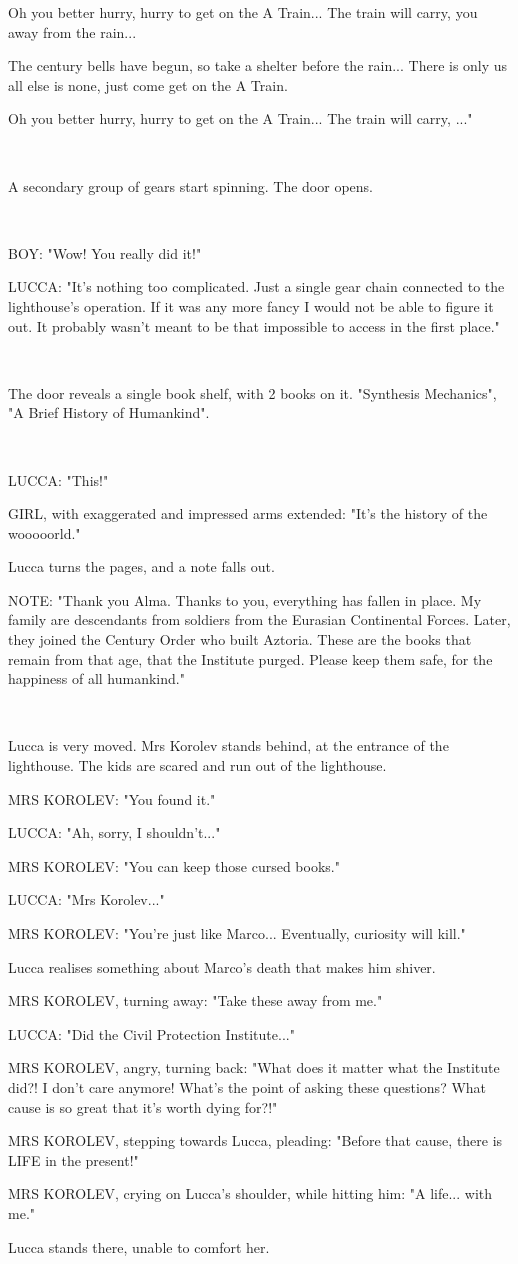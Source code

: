 \documentclass[11pt]{article}
\begin{document}
Oh you better hurry, hurry to get on the A Train...
The train will carry, you away from the rain...

The century bells have begun, so take a shelter before the rain...
There is only us all else is none, just come get on the A Train.

Oh you better hurry, hurry to get on the A Train...
The train will carry, ..."

\ 

A secondary group of gears start spinning.
The door opens.

\ 

BOY: "Wow! You really did it!"

LUCCA: "It's nothing too complicated. Just a single gear chain connected to the lighthouse's operation. 
If it was any more fancy I would not be able to figure it out.
It probably wasn't meant to be that impossible to access in the first place."

\ 

The door reveals a single book shelf, with 2 books on it. 
"Synthesis Mechanics", "A Brief History of Humankind".

\ 

LUCCA: "This!"

GIRL, with exaggerated and impressed arms extended: "It's the history of the wooooorld."

Lucca turns the pages, and a note falls out.

NOTE: "Thank you Alma. Thanks to you, everything has fallen in place.
My family are descendants from soldiers from the Eurasian Continental Forces. 
Later, they joined the Century Order who built Aztoria.
These are the books that remain from that age, that the Institute purged.
Please keep them safe, for the happiness of all humankind."

\ 

Lucca is very moved.
Mrs Korolev stands behind, at the entrance of the lighthouse.
The kids are scared and run out of the lighthouse.

MRS KOROLEV: "You found it."

LUCCA: "Ah, sorry, I shouldn't..."

MRS KOROLEV: "You can keep those cursed books."

LUCCA: "Mrs Korolev..."

MRS KOROLEV: "You're just like Marco...
Eventually, curiosity will kill."

Lucca realises something about Marco's death that makes him shiver.

MRS KOROLEV, turning away: "Take these away from me."

LUCCA: "Did the Civil Protection Institute..."

MRS KOROLEV, angry, turning back: "What does it matter what the Institute did?!
I don't care anymore!
What's the point of asking these questions?
What cause is so great that it's worth dying for?!"

MRS KOROLEV, stepping towards Lucca, pleading: "Before that cause, there is LIFE in the present!"

MRS KOROLEV, crying on Lucca's shoulder, while hitting him: "A life... with me."

Lucca stands there, unable to comfort her.
\end{document}
